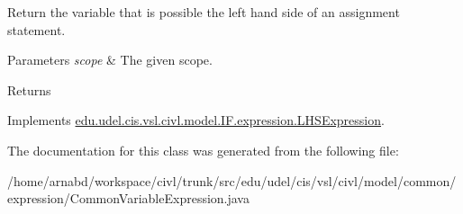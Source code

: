 Return the variable that is possible the left hand side of an assignment statement. 


\begin{DoxyParams}{Parameters}
{\em scope} & The given scope. \\
\hline
\end{DoxyParams}
\begin{DoxyReturn}{Returns}

\end{DoxyReturn}


Implements \hyperlink{interfaceedu_1_1udel_1_1cis_1_1vsl_1_1civl_1_1model_1_1IF_1_1expression_1_1LHSExpression_a78e628bb1248aa61856dcf4a921aff52}{edu.\+udel.\+cis.\+vsl.\+civl.\+model.\+I\+F.\+expression.\+L\+H\+S\+Expression}.



The documentation for this class was generated from the following file\+:\begin{DoxyCompactItemize}
\item 
/home/arnabd/workspace/civl/trunk/src/edu/udel/cis/vsl/civl/model/common/expression/Common\+Variable\+Expression.\+java\end{DoxyCompactItemize}
